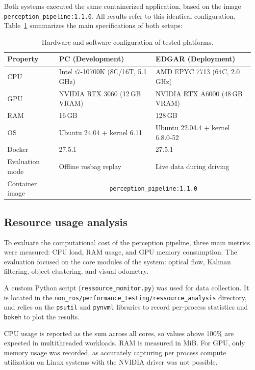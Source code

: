 Both systems executed the same containerized application, based on 
the image \texttt{perception\_pipeline:1.1.0}. All results refer to this 
identical configuration. Table~\ref{tab:hardware_platforms} summarizes 
the main specifications of both setups:

\begin{table}[H]
  \centering
  \begin{tabularx}{\textwidth}{l X X}
    \toprule
    \textbf{Property} & \textbf{PC (Development)} & \textbf{EDGAR (Deployment)} \\
    \midrule
    CPU & Intel i7-10700K (8C/16T, 5.1\,GHz) & AMD EPYC 7713 (64C, 2.0\,GHz) \\
    GPU & NVIDIA RTX 3060 (12\,GB VRAM) & NVIDIA RTX A6000 (48\,GB VRAM) \\
    RAM & 16\,GB & 128\,GB \\
    OS & Ubuntu 24.04 + kernel 6.11 & Ubuntu 22.04.4 + kernel 6.8.0-52 \\
    Docker & 27.5.1 & 27.5.1 \\
    Evaluation mode & Offline rosbag replay & Live data during driving \\
    Container image & \multicolumn{2}{c}{\texttt{perception\_pipeline:1.1.0}} \\
    \bottomrule
  \end{tabularx}
  \caption{Hardware and software configuration of tested platforms.}
  \label{tab:hardware_platforms}
\end{table}


\subsection{Resource usage analysis}\label{sec:ResourceUsage}

To evaluate the computational cost of the perception pipeline,
three main metrics were measured: CPU load, RAM usage, and GPU memory
consumption. The evaluation focused on the core modules of the system:
optical flow, Kalman filtering, object clustering, and visual odometry.

A custom Python script (\texttt{ressource\_monitor.py}) was used for
data collection. It is located in the
\texttt{non\_ros/performance\_testing/ressource\_analysis} directory,
and relies on the \texttt{psutil} and \texttt{pynvml} libraries to
record per-process statistics and \texttt{bokeh} to plot the results.

CPU usage is reported as the sum across all cores, so values above
100\% are expected in multithreaded workloads. RAM is measured in MiB.
For GPU, only memory usage was recorded, as accurately capturing per process compute
utilization on Linux systems with the NVIDIA driver was not possible.

